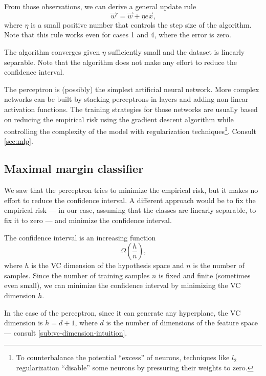 From those observations, we can derive a general update rule
\[
  \vec{w}' = \vec{w} + \eta e \vec{x}\text{,}
\]
where $\eta$ is a small positive number that controls the step size of the algorithm.
Note that this rule works even for cases 1 and 4, where the error is zero.

The algorithm converges given $\eta$ sufficiently small and the dataset is linearly
separable.  Note that the algorithm does not make any effort to reduce the confidence
interval.

The perceptron is (possibly) the simplest artificial neural network.  More complex
networks can be built by stacking perceptrons in layers and adding non-linear activation
functions.  The training strategies for those networks are usually based on reducing the
empirical risk using the gradient descent algorithm while controlling the complexity of
the model with regularization techniques\footnote{To counterbalance the potential
``excess'' of neurons, techniques like $l_2$ regularization ``disable'' some neurons by
pressuring their weights to zero.}.  Consult \cref{sec:mlp}.


\subsection{Maximal margin classifier}

We saw that the perceptron tries to minimize the empirical risk, but it makes no effort to
reduce the confidence interval.  A different approach would be to fix the empirical risk
--- in our case, assuming that the classes are linearly separable, to fix it to zero --- and
minimize the confidence interval.

The confidence interval is an increasing function
\[
  \Omega\!\left(\frac{h}{n}\right)\text{,}
\]
where $h$ is the VC dimension of the hypothesis space and $n$ is the number of samples.
Since the number of training samples $n$ is fixed and finite (sometimes even small), we
can minimize the confidence interval by minimizing the VC dimension $h$.

In the case of the perceptron, since it can generate any hyperplane, the VC dimension is
$h = d + 1$, where $d$ is the number of dimensions of the feature space --- consult
\cref{sub:vc-dimension-intuition}.

